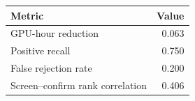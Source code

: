 \begin{tabular}{lr}
\toprule
Metric & Value \\
\midrule
GPU-hour reduction & 0.063 \\
Positive recall & 0.750 \\
False rejection rate & 0.200 \\
Screen--confirm rank correlation & 0.406 \\
\bottomrule
\end{tabular}
